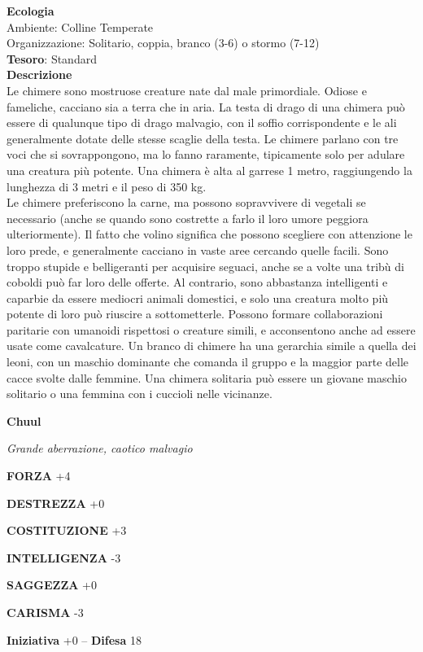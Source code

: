 \begin{multicols}{2}
\textbf{Ecologia}\\
Ambiente: Colline Temperate\\
Organizzazione: Solitario, coppia, branco (3-6) o stormo (7-12)\\
\textbf{Tesoro}: Standard\\
\textbf{Descrizione}\\
Le chimere sono mostruose creature nate dal male primordiale. Odiose e fameliche, cacciano sia a terra che in aria. La testa di drago di una chimera può essere di qualunque tipo di drago malvagio, con il soffio corrispondente e le ali generalmente dotate delle stesse scaglie della testa. Le chimere parlano con tre voci che si sovrappongono, ma lo fanno raramente, tipicamente solo per adulare una creatura più potente. Una chimera è alta al garrese 1 metro, raggiungendo la lunghezza di 3 metri e il peso di 350 kg.\\
Le chimere preferiscono la carne, ma possono sopravvivere di vegetali se necessario (anche se quando sono costrette a farlo il loro umore peggiora ulteriormente). Il fatto che volino significa che possono scegliere con attenzione le loro prede, e generalmente cacciano in vaste aree cercando quelle facili. Sono troppo stupide e belligeranti per acquisire seguaci, anche se a volte una tribù di coboldi può far loro delle offerte. Al contrario, sono abbastanza intelligenti e caparbie da essere mediocri animali domestici, e solo una creatura molto più potente di loro può riuscire a sottometterle. Possono formare collaborazioni paritarie con umanoidi rispettosi o creature simili, e acconsentono anche ad essere usate come cavalcature. Un branco di chimere ha una gerarchia simile a quella dei leoni, con un maschio dominante che comanda il gruppo e la maggior parte delle cacce svolte dalle femmine. Una chimera solitaria può essere un giovane maschio solitario o una femmina con i cuccioli nelle vicinanze.


\medskip{}\textbf{Chuul}

\textit{Grande aberrazione, caotico malvagio}

\textbf{FORZA} +4

\textbf{DESTREZZA} +0

\textbf{COSTITUZIONE} +3

\textbf{INTELLIGENZA} -3

\textbf{SAGGEZZA} +0

\textbf{CARISMA} -3

\textbf{Iniziativa} +0 -- \textbf{Difesa} 18


\end{multicols}

